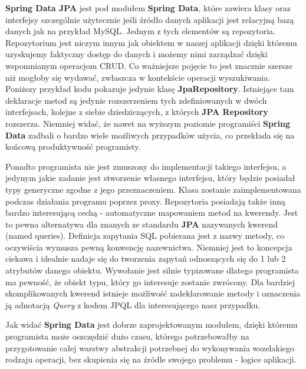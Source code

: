 	\label{tech:spring_data_jpa}
	\textbf{Spring Data JPA} jest pod modułem \textbf{Spring Data}, które zawiera klasy oraz interfejsy szczególnie użytecznie jeśli
	źródło danych aplikacji jest relacyjną bazą danych jak na przykład MySQL. Jednym z tych elementów są repozytoria.
	Repozytorium jest niczym innym jak obiektem w naszej aplikacji dzięki któremu uzyskujemy faktyczny dostęp do danych i możemy
	nimi zarządzać dzięki wspomnianym operacjom CRUD. Co ważniejsze pojęcie to jest znacznie szersze niż mogłoby
	się wydawać, zwłaszcza w kontekście operacji wyszukiwania. Poniższy przykład kodu pokazuje jedynie klasę \textbf{JpaRepository}. 
	Istniejące tam deklaracje metod są jedynie rozszerzeniem tych zdefiniowanych w dwóch interfejsach, kolejne z siebie dziedziczących, z
	których \textbf{JPA Repository} rozszerza. Niemniej widać, że nawet na wyższym poziomie programiści \textbf{Spring Data} zadbali o bardzo
	wiele możliwych przypadków użycia, co przekłada się na końcową produktywność programisty. 
	Ponadto programista nie jest zmuszony do implementacji takiego interfejsu, a jedynym jakie zadanie jest stworzenie własnego interfejsu, który będzie
	posiadał typy generyczne zgodne z jego przeznaczeniem. Klasa zostanie zaimplementowana podczas działania programu poprzez proxy. 
	Repozytoria posiadają także inną bardzo interesującą cechą - automatyczne mapowaniem metod na kwerendy. Jest to pewna alternatywa dla znanych ze standardu
	\textbf{JPA} nazywanych kwerend (named queries). Definicja zapytania SQL pobierana jest z nazwy metody, co oczywiścia wymusza pewną konwencję nazewnictwa. 
	Niemniej jest to koncepcja ciekawa i idealnie nadaje się do tworzenia zapytań odnoszących się do 1 lub 2 atrybutów danego obiektu. Wywołanie jest silnie
	typizowane dlatego programista ma pewność, że obiekt typu, który go interesuje zostanie zwrócony. Dla bardziej skomplikowanych kwerend istnieje
	możliwość zadeklarowanie metody i oznaczenia ją adnotacją \textit{\@{}Query} z kodem JPQL\cite{jpql} dla interesującego nasz przypadku\cite{spring_data}.
	
	Jak widać \textbf{Spring Data} jest dobrze zaprojektowanym modułem, dzięki któremu programista może oszczędzić dużo czasu, którego potrzebowałby 
	na przygotowanie całej warstwy abstrakcji potrzebnej do wykonywania wszelakiego rodzaju operacji, bez skupienia się na źródle swojego problemu - logice
	aplikacji. 

